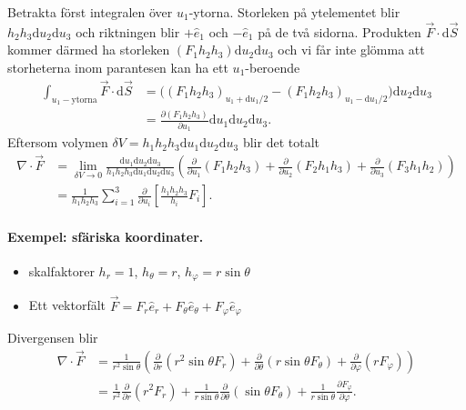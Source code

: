 \documentclass[%
oneside,                 %
final,                   %
10pt]{article}
\begin{document}
\noindent
Betrakta först integralen över $u_1$-ytorna. Storleken på ytelementet blir $h_2 h_3 \mbox{d}u_2 \mbox{d}u_3$ och riktningen blir $+\hat{e}_1$ och $-\hat{e}_1$ på de två sidorna. Produkten $\vec{F} \cdot \mbox{d} \vec{S}$ kommer därmed ha storleken $(F_1 h_2 h_3) \mbox{d}u_2 \mbox{d}u_3$ och vi får inte glömma att storheterna inom parantesen kan ha ett $u_1$-beroende
\begin{align}
\int_{u_1-\mathrm{ytorna}} \vec{F} \cdot \mbox{d} \vec{S} &= \Big( (F_1 h_2 h_3)_{u_1 + \mathrm{d} u_1/2} - (F_1 h_2 h_3)_{u_1-\mathrm{d} u_1/2} \Big)  \mbox{d}u_2 \mbox{d}u_3 \nonumber \\
&= \frac{\partial (F_1 h_2 h_3)}{\partial u_1} \mbox{d}u_1 \mbox{d}u_2 \mbox{d}u_3.
\end{align}
Eftersom volymen $\delta V = h_1 h_2 h_3 \mbox{d}u_1 \mbox{d}u_2 \mbox{d}u_3$ blir det totalt
\begin{align}
\nabla \cdot \vec{F} &= \lim_{\delta V \to 0}  \frac{\mbox{d}u_1 \mbox{d}u_2 \mbox{d}u_3}{h_1 h_2 h_3 \mbox{d}u_1 \mbox{d}u_2 \mbox{d}u_3} \left( \frac{\partial}{\partial u_1} (F_1 h_2 h_3) + \frac{\partial}{\partial u_2} (F_2 h_1 h_3) + \frac{\partial}{\partial u_3} (F_3 h_1 h_2) \right) \nonumber \\
&= \frac{1}{h_1 h_2 h_3} \sum_{i=1}^3 \frac{\partial}{\partial u_i} \left[ \frac{h_1 h_2 h_3}{h_i} F_i \right].
\end{align}

\paragraph{Exempel: sfäriska koordinater.}
\begin{itemize}
\item skalfaktorer $h_r=1$, $h_\theta=r$, $h_\varphi = r \sin\theta$

\item Ett vektorfält $\vec{F} = F_r \hat{e}_r + F_\theta \hat{e}_\theta + F_\varphi \hat{e}_\varphi$
\end{itemize}

\noindent
Divergensen blir
\begin{align}
\nabla \cdot \vec{F} &= \frac{1}{r^2 \sin\theta} \left( \frac{\partial}{\partial r} \left( r^2 \sin\theta F_r \right) + \frac{\partial}{\partial \theta} \left( r \sin\theta F_\theta \right) + \frac{\partial}{\partial \varphi} \left( r F_\varphi \right) \right) \nonumber \\
&= \frac{1}{r^2} \frac{\partial}{\partial r} \left( r^2 F_r \right) + \frac{1}{r \sin\theta} \frac{\partial}{\partial \theta} \left( \sin\theta F_\theta \right) + \frac{1}{r \sin\theta} \frac{\partial F_\varphi}{\partial \varphi}.
\end{align}
\end{document}
